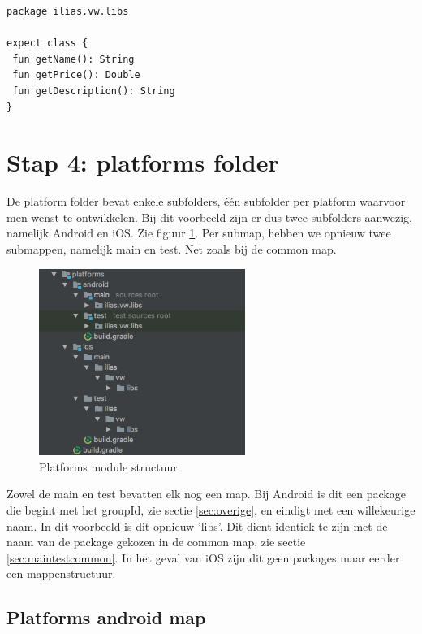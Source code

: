 \begin{lstlisting}
package ilias.vw.libs

expect class {
 fun getName(): String
 fun getPrice(): Double
 fun getDescription(): String
}
\end{lstlisting}

\section{Stap 4: platforms folder}
De platform folder bevat enkele subfolders, één subfolder per platform waarvoor men wenst te ontwikkelen. Bij dit voorbeeld zijn er dus twee subfolders aanwezig, namelijk Android en iOS. Zie figuur \ref{fig:stap4-structuur}. Per submap, hebben we opnieuw twee submappen, namelijk main en test. Net zoals bij de common map. 

\begin{figure} [ht]
	\centering
	\includegraphics[width=0.60\textwidth]{img/stap4-structuur.png}
	\caption{Platforms module structuur}
	\label{fig:stap4-structuur}
\end{figure}

Zowel de main en test bevatten elk nog een map. Bij Android is dit een package die begint met het groupId, zie sectie \ref{sec:overige}, en eindigt met een willekeurige naam. In dit voorbeeld is dit opnieuw 'libs'. Dit dient identiek te zijn met de naam van de package gekozen in de common map, zie sectie \ref{sec:maintestcommon}. In het geval van iOS zijn dit geen packages maar eerder een mappenstructuur.

\subsection{Platforms android map}
